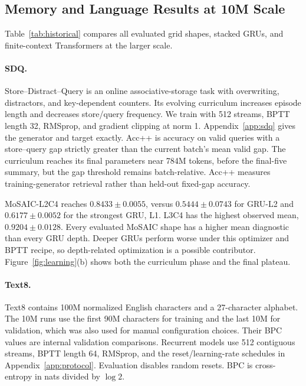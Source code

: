 \documentclass[letterpaper,twoside]{article}
\begin{document}


\subsection{Memory and Language Results at 10M Scale}

Table~\ref{tab:historical} compares all evaluated grid shapes, stacked GRUs, and finite-context Transformers at the larger scale.

\paragraph{SDQ.}
Store--Distract--Query is an online associative-storage task with overwriting, distractors, and key-dependent counters. Its evolving curriculum increases episode length and decreases store/query frequency. We train with 512 streams, BPTT length 32, RMSprop, and gradient clipping at norm 1. Appendix~\ref{app:sdq} gives the generator and target exactly. Acc++ is accuracy on valid queries with a store--query gap strictly greater than the current batch's mean valid gap. The curriculum reaches its final parameters near 784M tokens, before the final-five summary, but the gap threshold remains batch-relative. Acc++ measures training-generator retrieval rather than held-out fixed-gap accuracy.

MoSAIC-L2C4 reaches $0.8433\pm0.0055$, versus $0.5444\pm0.0743$ for GRU-L2 and $0.6177\pm0.0052$ for the strongest GRU, L1. L3C4 has the highest observed mean, $0.9204\pm0.0128$. Every evaluated MoSAIC shape has a higher mean diagnostic than every GRU depth. Deeper GRUs perform worse under this optimizer and BPTT recipe, so depth-related optimization is a possible contributor. Figure~\ref{fig:learning}(b) shows both the curriculum phase and the final plateau.

\paragraph{Text8.}
Text8 \citep{mahoney2011text8} contains 100M normalized English characters and a 27-character alphabet. The 10M runs use the first 90M characters for training and the last 10M for validation, which was also used for manual configuration choices. Their BPC values are internal validation comparisons. Recurrent models use 512 contiguous streams, BPTT length 64, RMSprop, and the reset/learning-rate schedules in Appendix~\ref{app:protocol}. Evaluation disables random resets. BPC is cross-entropy in nats divided by $\log 2$.
\end{document}
